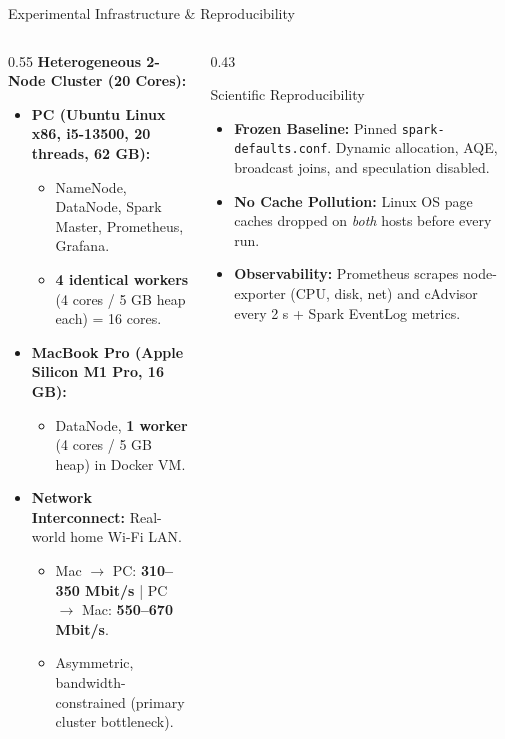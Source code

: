 \documentclass[aspectratio=169, 10pt]{beamer}
\begin{document}
\begin{frame}{Experimental Infrastructure \& Reproducibility}
  \begin{columns}[T]
    \begin{column}{0.55\textwidth}
      \textbf{Heterogeneous 2-Node Cluster (20 Cores):}
      \begin{itemize}
        \item \textbf{PC (Ubuntu Linux x86, i5-13500, 20 threads, 62 GB):}
          \begin{itemize}
            \footnotesize
            \item NameNode, DataNode, Spark Master, Prometheus, Grafana.
            \item \textbf{4 identical workers} (4 cores / 5 GB heap each) = 16 cores.
          \end{itemize}
        \item \textbf{MacBook Pro (Apple Silicon M1 Pro, 16 GB):}
          \begin{itemize}
            \footnotesize
            \item DataNode, \textbf{1 worker} (4 cores / 5 GB heap) in Docker VM.
          \end{itemize}
        \item \textbf{Network Interconnect:} Real-world home Wi-Fi LAN.
          \begin{itemize}
            \footnotesize
            \item Mac $\rightarrow$ PC: \textbf{310--350 Mbit/s} | PC $\rightarrow$ Mac: \textbf{550--670 Mbit/s}.
            \item Asymmetric, bandwidth-constrained (primary cluster bottleneck).
          \end{itemize}
      \end{itemize}
    \end{column}

    \begin{column}{0.43\textwidth}
      \begin{block}{Scientific Reproducibility}
        \begin{itemize}
          \footnotesize
          \item \textbf{Frozen Baseline:} Pinned \texttt{spark-defaults.conf}. Dynamic allocation, AQE, broadcast joins, and speculation disabled.
          \item \textbf{No Cache Pollution:} Linux OS page caches dropped on \textit{both} hosts before every run.
          \item \textbf{Observability:} Prometheus scrapes node-exporter (CPU, disk, net) and cAdvisor every 2 s + Spark EventLog metrics.
        \end{itemize}
      \end{block}
    \end{column}
  \end{columns}
\end{frame}
\end{document}
